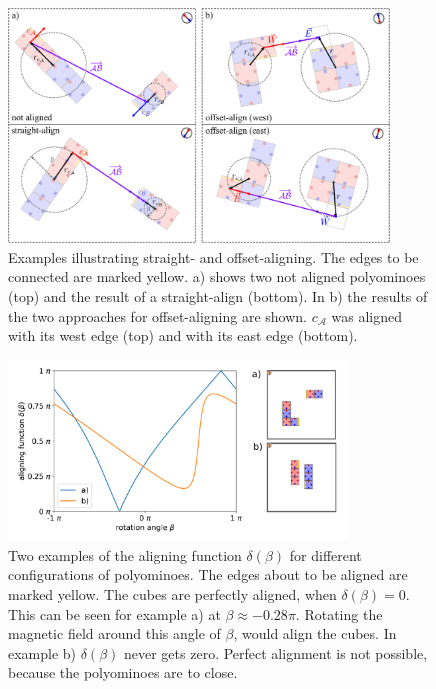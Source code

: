 \begin{figure}
	\centering
	\includegraphics[width=0.90\textwidth]{figures/aligning.pdf}
	\caption[Illustration of straight- and offset-aligning]{Examples illustrating straight- and offset-aligning. The edges to be connected are marked yellow. a) shows two not aligned polyominoes (top) and the result of a straight-align (bottom). In b) the results of the two approaches for offset-aligning are shown. $c_\mathcal{A}$ was aligned with its west edge (top) and with its east edge (bottom).}
	\label{fig:aligning}
\end{figure}

\begin{figure}
	\centering
	\includegraphics[width=0.8\textwidth]{figures/plots/aligning_function.pdf}
	\caption[Examples of aligning functions $\delta(\beta)$]{Two examples of the aligning function $\delta(\beta)$ for different configurations of polyominoes. The edges about to be aligned are marked yellow. The cubes are perfectly aligned, when $\delta(\beta) = 0$. This can be seen for example a) at $\beta \approx -0.28\pi$. Rotating the magnetic field around this angle of $\beta$, would align the cubes. In example b) $\delta(\beta)$ never gets zero. Perfect alignment is not possible, because the polyominoes are to close.}
	\label{fig:aligning_plot}
\end{figure}

